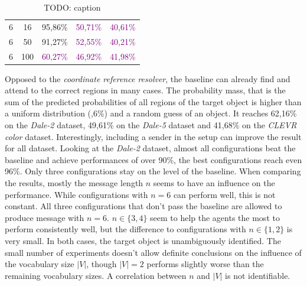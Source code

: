 \begin{table}[ht]
\begin{tabular}{cc|c|c|c}
        {6}                           & {16}      & {95,86\%}                           & \textcolor{purple}{50,71\%}         & \textcolor{purple}{40,61\%}              \\
        {6}                           & {50}      & {91,27\%}                           & \textcolor{purple}{52,55\%}         & \textcolor{purple}{40,21\%}              \\
        {6}                           & {100}     & \textcolor{purple}{60,27\%}         & \textcolor{purple}{46,92\%}         & \textcolor{purple}{41,98\%}              \\
        \bottomrule
    \end{tabular}
    \caption{TODO: caption}
    \label{tab:results:attention-reference-resolver-game}
\end{table}

Opposed to the \emph{coordinate reference resolver}, the baseline can already find and attend to the correct regions in many cases.
The probability mass, that is the sum of the predicted probabilities of all regions of the target object is higher than a uniform distribution (,6\%) and a random guess of an object.
It reaches 62,16\% on the \emph{Dale-2} dataset, 49,61\% on the \emph{Dale-5} dataset and 41,68\% on the \emph{CLEVR color} dataset.
Interestingly, including a sender in the setup can improve the result for all dataset.
Looking at the \emph{Dale-2} dataset, almost all configurations beat the baseline and achieve performances of over 90\%, the best configurations reach even 96\%.
Only three configurations stay on the level of the baseline.
When comparing the results, mostly the message length $n$ seems to have an influence on the performance.
While configurations with $n=6$ can perform well, this is not constant.
All three configurations that don't pass the baseline are allowed to produce message with $n=6$.
$n \in \{3,4\}$ seem to help the agents the most to perform consistently well, but the difference to configurations with $n \in \{1,2\}$ is very small.
In both cases, the target object is unambiguously identified.
The small number of experiments doesn't allow definite conclusions on the influence of the vocabulary size $|V|$, though $|V|=2$ performs slightly worse than the remaining vocabulary sizes.
A correlation between $n$ and $|V|$ is not identifiable.

